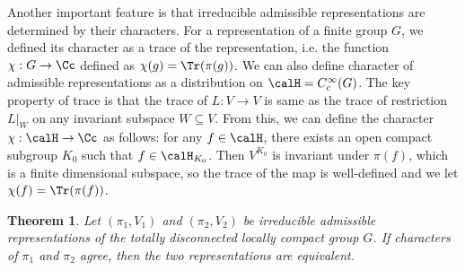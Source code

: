 \documentclass{article}
\newtheorem{theorem}{Theorem}[section]
\begin{document}
Another important feature is that irreducible admissible representations are determined by their characters. 
For a representation of a finite group $G$, we defined its character as a trace of the representation, i.e. the function $\chi:G\to \Cc$ defined as $\chi(g) = \Tr(\pi(g))$. 
We can also define character of admissible representations as a distribution on $\calH = C^{\infty}_{c}(G)$. The key property of trace is that the trace of $L:V\to V$ is same as the trace of restriction $L|_{W}$ on any invariant subspace $W\subseteq V$. From this, we can define the character $\chi:\calH\to \Cc$ as follows: for any $f\in \calH$, there exists an open compact subgroup $K_{0}$ such that $f\in\calH_{K_{0}}$.  
Then $V^{K_{0}}$ is invariant under $\pi(f)$, which is a finite dimensional subspace, so the trace of the map is well-defined and we let $\chi(f) = \Tr(\pi(f))$. 
\begin{theorem}
\label{char}
Let $(\pi_{1}, V_{1})$ and $(\pi_{2}, V_{2})$ be irreducible admissible representations of the totally disconnected locally compact group $G$. If characters of $\pi_{1}$ and $\pi_{2}$ agree, then the two representations are equivalent. 
\end{theorem}
\end{document}

